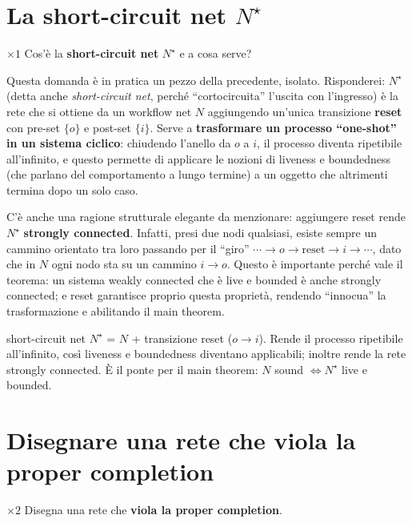 \section{La short-circuit net \texorpdfstring{$N^\star$}{N*}}

\begin{domanda}{$\times 1$}
Cos'è la \textbf{short-circuit net} $N^\star$ e a cosa serve?
\end{domanda}

Questa domanda è in pratica un pezzo della precedente, isolato. Risponderei: $N^\star$ (detta anche \emph{short-circuit net}, perché ``cortocircuita'' l'uscita con l'ingresso) è la rete che si ottiene da un workflow net $N$ aggiungendo un'unica transizione \textbf{reset} con pre-set $\{o\}$ e post-set $\{i\}$. Serve a \textbf{trasformare un processo ``one-shot'' in un sistema ciclico}: chiudendo l'anello da $o$ a $i$, il processo diventa ripetibile all'infinito, e questo permette di applicare le nozioni di liveness e boundedness (che parlano del comportamento a lungo termine) a un oggetto che altrimenti termina dopo un solo caso.

C'è anche una ragione strutturale elegante da menzionare: aggiungere reset rende $N^\star$ \textbf{strongly connected}. Infatti, presi due nodi qualsiasi, esiste sempre un cammino orientato tra loro passando per il ``giro'' $\cdots \to o \to \text{reset} \to i \to \cdots$, dato che in $N$ ogni nodo sta su un cammino $i \to o$. Questo è importante perché vale il teorema: un sistema weakly connected che è live e bounded è anche strongly connected; e reset garantisce proprio questa proprietà, rendendo ``innocua'' la trasformazione e abilitando il main theorem.

\begin{puntochiave}{short-circuit net}
$N^\star$ = $N$ + transizione reset ($o \to i$). Rende il processo ripetibile all'infinito, così liveness e boundedness diventano applicabili; inoltre rende la rete strongly connected. È il ponte per il main theorem: $N$ sound $\iff N^\star$ live e bounded.
\end{puntochiave}

\section{Disegnare una rete che viola la proper completion}

\begin{domanda}{$\times 2$}
Disegna una rete che \textbf{viola la proper completion}.
\end{domanda}

